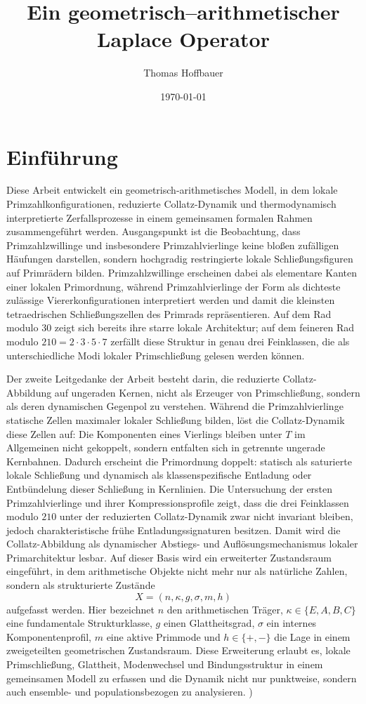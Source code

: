 \documentclass[11pt,a4paper]{article}
\title{Ein geometrisch--arithmetischer Laplace Operator}
\author{Thomas Hoffbauer}
\date{\today}
\theoremstyle{definition}
\begin{document}
	
	\maketitle
\section{Einführung}
	Diese Arbeit entwickelt ein geometrisch-arithmetisches Modell, in dem lokale Primzahlkonfigurationen, reduzierte Collatz-Dynamik und thermodynamisch interpretierte Zerfallsprozesse in einem gemeinsamen formalen Rahmen zusammengeführt werden. Ausgangspunkt ist die Beobachtung, dass Primzahlzwillinge und insbesondere Primzahlvierlinge keine bloßen zufälligen Häufungen darstellen, sondern hochgradig restringierte lokale Schließungsfiguren auf Primrädern bilden. Primzahlzwillinge erscheinen dabei als elementare Kanten einer lokalen Primordnung, während Primzahlvierlinge der Form 	als dichteste zulässige Viererkonfigurationen interpretiert werden und damit die kleinsten tetraedrischen Schließungszellen des Primrads repräsentieren. Auf dem Rad modulo \(30\) zeigt sich bereits ihre starre lokale Architektur; auf dem feineren Rad modulo \(210=2\cdot 3\cdot 5\cdot 7\) zerfällt diese Struktur in genau drei Feinklassen, die als unterschiedliche Modi lokaler Primschließung gelesen werden können. 
	
	Der zweite Leitgedanke der Arbeit besteht darin, die reduzierte Collatz-Abbildung auf ungeraden Kernen, 	nicht als Erzeuger von Primschließung, sondern als deren dynamischen Gegenpol zu verstehen. Während die Primzahlvierlinge statische Zellen maximaler lokaler Schließung bilden, löst die Collatz-Dynamik diese Zellen auf: Die Komponenten eines Vierlings bleiben unter \(T\) im Allgemeinen nicht gekoppelt, sondern entfalten sich in getrennte ungerade Kernbahnen. Dadurch erscheint die Primordnung doppelt: statisch als saturierte lokale Schließung und dynamisch als klassenspezifische Entladung oder Entbündelung dieser Schließung in Kernlinien. Die Untersuchung der ersten Primzahlvierlinge und ihrer Kompressionsprofile zeigt, dass die drei Feinklassen modulo \(210\) unter der reduzierten Collatz-Dynamik zwar nicht invariant bleiben, jedoch charakteristische frühe Entladungssignaturen besitzen. Damit wird die Collatz-Abbildung als dynamischer Abstiegs- und Auflösungsmechanismus lokaler Primarchitektur lesbar.  	Auf dieser Basis wird ein erweiterter Zustandsraum eingeführt, in dem arithmetische Objekte nicht mehr nur als natürliche Zahlen, sondern als strukturierte Zustände
	\[
	X=(n,\kappa,g,\sigma,m,h)
	\]
	aufgefasst werden. Hier bezeichnet \(n\) den arithmetischen Träger, \(\kappa\in\{E,A,B,C\}\) eine fundamentale Strukturklasse, \(g\) einen Glattheitsgrad, \(\sigma\) ein internes Komponentenprofil, \(m\) eine aktive Primmode und \(h\in\{+,-\}\) die Lage in einem zweigeteilten geometrischen Zustandsraum. Diese Erweiterung erlaubt es, lokale Primschließung, Glattheit, Modenwechsel und Bindungsstruktur in einem gemeinsamen Modell zu erfassen und die Dynamik nicht nur punktweise, sondern auch ensemble- und populationsbezogen zu analysieren. )
	
\end{document}
